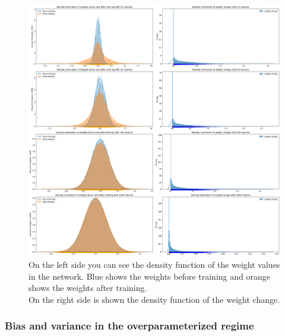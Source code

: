 \begin{figure}[!htp]
\centering
\includegraphics[scale=0.3]{Abschlussarbeit_2021/LaTeX/images/Weightdist_15k_sns.png.png}
\caption{On the left side you can see the density function of the weight values in the network. Blue shows the weights before training and orange shows the weights after training. \\
On the right side is shown the density function of the weight change.  }
\label{density_weights}
\end{figure}

\newpage


\subsubsection{Bias and variance in the overparameterized regime}

